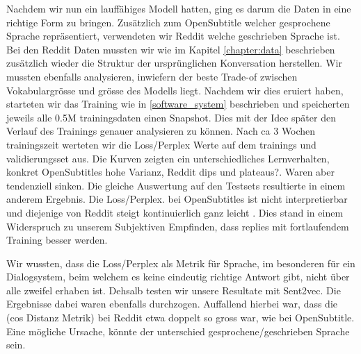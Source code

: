 Nachdem wir nun ein lauffähiges Modell hatten, ging es darum die Daten in eine richtige Form zu bringen. Zusätzlich zum OpenSubtitle welcher gesprochene Sprache repräsentiert, verwendeten wir Reddit welche geschrieben Sprache ist.  Bei den Reddit Daten mussten wir wie im Kapitel \ref{chapter:data} beschrieben zusätzlich wieder die Struktur der ursprünglichen Konversation herstellen. Wir mussten ebenfalls analysieren, inwiefern der beste Trade-of zwischen Vokabulargrösse und grösse des Modells liegt.
Nachdem wir dies eruiert haben, starteten wir das Training wie in \ref{software_system} beschrieben und speicherten jeweils alle 0.5M trainingsdaten einen Snapshot. Dies mit der Idee später den Verlauf des Trainings genauer analysieren zu können. Nach ca 3 Wochen trainingszeit werteten wir die Loss/Perplex Werte auf dem trainings und validierungsset aus. Die Kurven zeigten ein unterschiedliches Lernverhalten, konkret OpenSubtitles hohe Varianz, Reddit dips und plateaus?. Waren aber tendenziell sinken. Die gleiche Auswertung auf den Testsets resultierte in einem anderem Ergebnis. Die Loss/Perplex. bei OpenSubtitles ist nicht interpretierbar und diejenige von Reddit steigt kontinuierlich ganz leicht . Dies stand in einem Widerspruch zu unserem Subjektiven Empfinden, dass replies mit fortlaufendem Training besser werden.

Wir wussten, dass die Loss/Perplex als Metrik für Sprache, im besonderen für ein Dialogsystem, beim welchem es keine eindeutig richtige Antwort gibt, nicht über alle zweifel erhaben ist. Dehsalb testen wir unsere Resultate mit Sent2vec. Die Ergebnisse dabei waren ebenfalls durchzogen. Auffallend hierbei war, dass die (cos Distanz Metrik) bei Reddit etwa doppelt so gross war, wie bei OpenSubtitle. Eine mögliche Ursache, könnte der unterschied gesprochene/geschrieben Sprache sein.

